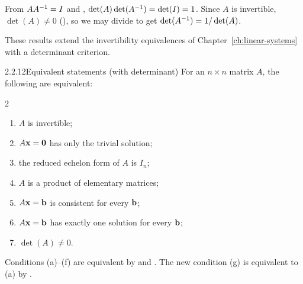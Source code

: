 \begin{prf}
From $AA^{-1}=I$ and , $\det(A)\det(A^{-1})=\det(I)=1$. Since $A$ is invertible, $\det(A)\neq0$ (), so we may divide to get $\det(A^{-1})=1/\det(A)$.
\end{prf}

These results extend the invertibility equivalences of Chapter~\ref{ch:linear-systems} with a determinant criterion.

\begin{thms}{2.2.12}{Equivalent statements (with determinant)}
For an $n\times n$ matrix $A$, the following are equivalent:
\begin{multicols}{2}
\begin{enumerate}[label=\textup{(\alph*)},leftmargin=1.6em,itemsep=1pt]
\item $A$ is invertible;
\item $A\mathbf{x}=\mathbf{0}$ has only the trivial solution;
\item the reduced echelon form of $A$ is $I_n$;
\item $A$ is a product of elementary matrices;
\item $A\mathbf{x}=\mathbf{b}$ is consistent for every $\mathbf{b}$;
\item $A\mathbf{x}=\mathbf{b}$ has exactly one solution for every $\mathbf{b}$;
\item $\det(A)\neq0$.
\end{enumerate}
\end{multicols}
\end{thms}

\begin{prf}
Conditions (a)--(f) are equivalent by  and . The new condition (g) is equivalent to (a) by .
\end{prf}

